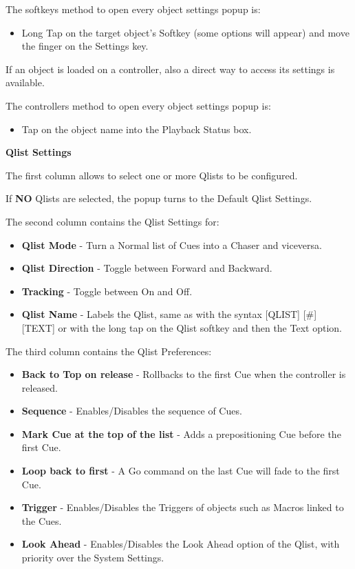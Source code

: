 \documentclass[
]{article}
\providecommand{\tightlist}{%
  \setlength{\itemsep}{0pt}\setlength{\parskip}{0pt}}
\begin{document}
The softkeys method to open every object settings popup is:

\begin{itemize}
\tightlist
\item
  Long Tap on the target object's Softkey (some options will appear) and move the finger on the Settings key.
\end{itemize}

If an object is loaded on a controller, also a direct way to access its settings is available.

The controllers method to open every object settings popup is:

\begin{itemize}
\tightlist
\item
  Tap on the object name into the Playback Status box.
\end{itemize}

\textbf{Qlist Settings}

The first column allows to select one or more Qlists to be configured.

If \textbf{NO} Qlists are selected, the popup turns to the Default Qlist Settings.

The second column contains the Qlist Settings for:

\begin{itemize}
\item
  \textbf{Qlist Mode} - Turn a Normal list of Cues into a Chaser and viceversa.
\item
  \textbf{Qlist Direction} - Toggle between Forward and Backward.
\item
  \textbf{Tracking} - Toggle between On and Off.
\item
  \textbf{Qlist Name} - Labels the Qlist, same as with the syntax {[}QLIST{]} {[}\#{]} {[}TEXT{]} or with the long tap on the Qlist softkey and then the Text option.
\end{itemize}

The third column contains the Qlist Preferences:

\begin{itemize}
\item
  \textbf{Back to Top on release} - Rollbacks to the first Cue when the controller is released.
\item
  \textbf{Sequence} - Enables/Disables the sequence of Cues.
\item
  \textbf{Mark Cue at the top of the list} - Adds a prepositioning Cue before the first Cue.
\item
  \textbf{Loop back to first} - A Go command on the last Cue will fade to the first Cue.
\item
  \textbf{Trigger} - Enables/Disables the Triggers of objects such as Macros linked to the Cues.
\item
  \textbf{Look Ahead} - Enables/Disables the Look Ahead option of the Qlist, with priority over the System Settings.
\end{itemize}
\end{document}
